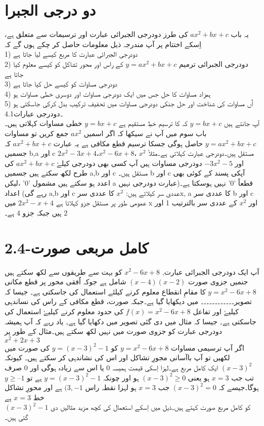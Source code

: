 \section{دو درجی الجبرا}
 یہ باب \(ax^{2}+bx+c\) کی طرز دودرجی الجبرائی عبارت اور ترسیمات سے متعلق ہے، اِسکے اختتام پر آپ مندرجہ ذیل معلومات حاصل کر چکے ہوں گے کہ\\
 1) دودرجی الجبرائی عبارت کا مربع کیسے لیا جاتا ہے\\
   2) دودرجی الجبرائی ترمیم \(y=ax^{2}+bx+c\) کے راس اور محور تشاکل کو کیسے معلوم کیا جاتا ہے\\
 3) دودرجی مساوات کو کیسے حل کیا جاتا ہے\\
 4) ہمزاد مساوات کا حل جس میں ایک دودرجی مساوات اور  دوسری خطی مساوات ہو\\
 5) اٌں مساوات کی شناخت اور حل جنکی دودرجی مساوات میں تحفیف ترکیب بدل کرکی جاسکتی ہو\\
 4.1۔دودرجی عبارات\\
 آپ جانتے ہیں \(y=bx+c\) کہ کا ترسیم خطِ مستقیم ہے \(y=bx+c\) خطی مساوات کہلاتی ہیں۔باب سوم میں آپ نے سیکھا کہ اگر اسمیں \(ax^{2}\) جمع کریں تو مساوات \(y=ax^{2}+bx+c\) حاصل ہوگی جسکا ترسیم قطع مکافی ہے یہ عبارت  \(ax^{2}+bx+c\) کہ جسمیں b,a اور c مستقل ہیں۔دودرجی عبارت کہلاتی ہے۔مثلاً \(x^{2}\) ،\(x^{2}-6x+8\)،\(2x^{2}-3x+4\)  اور  \(-3x^{2}-5\) دودرجی مساوات ہیں آپ کسی بھی دودرجی کیلۓ \(ax^{2}+bx+c\) کی طرح لکھ سکتے ہیں جسمیں a,b اور c مستقل ہیں۔ b اور c آپکی پسند کے کوئی بھی اعدد ہو سکتے ہیں مشمول '0' ،لیکں a قطعاً '0' نہیں ہوسکتا ہے۔(عبارت دودرجی نہیں رہے گی) اعداد a,b اور c عددی سر کیلاتے ہیں: \(x^{2}\) کا عددی سرx, a  کا عددی سر b اور c عمومی طور پر مستقل جزو کہلاتا ہے \(2x^{2}-x+4\) میں x اور \(x^{2}\) کے عددی سر بالترتیب 1 اور 2 ہیں جبکہ جزو 4 ہے۔\\
\section{ 2.4-کامل مربعی صورت}
 آپ ایک دودرجی الجبرائی عبارت, \(x^{2}-6x+8\) کو بہت سے طریقوں سے لکھ سکتے ہیں جنمیں جزوی صورت \((x-4)(x-2)\) شامل ہے جوکہ اٌفقی محور پر قطع مکانی \(y=x^{2}-6x+8\) کا مقامِ انقطاع معلوم کرنے کیلئے استعمال کی جاسکتی ہے۔ جیسا کہ تصویر۔۔۔۔۔۔۔۔۔۔۔۔ میں دیکھایا گیا ہے۔جبکہ صورت، قطع مکافی کے راس کی نساندہی کیلیۓ اور تفاعل \(f(x)=x^{2}-6x+8\) کی حدود معلوم کرنے کیلیۓ استعمال کی جاسکتی ہے۔ جیسا کہ مثال میں دی گئی تصویر میں دکھایا گیا ہے۔ یاد رہے کہ آپ ہمیشہ دودرجی عبارت کو جزوی صورت میں نہیں لکھ سکتے ہیں۔مثال کے طور پر \(x^{2}+2x+3\)\\
 \newpage
 اگر آپ ترسیمی مساوات \(y=x^{2}-6x+8\) کو \(y=(x-3)^{2}-1\) کی صورت میں لکھیں تو آپ باآسانی مجورِ تشاکل اور اس کی نشاندہی کر سکتے ہیں۔ کیونکہ \((x-3)^{2}\) ایک کامل مربع ہے۔لہزا اِسکی قیمت ہمیسہ 0 یا اس سے زیادہ ہوگی اور 0 صرف تب جب \(x=3\) ہو یعنی  \((x-3)^{2}\ge 0\)  ہو اور چونکہ \(y=(x-3)^{2}-1\) ہے تو  \(y\ge – 1\) ہوگا۔جیسے کہ \((x-3)^{2}=0\)  جب \(x=3\) ہو لہزا نقطہ راس  \((3,-1\) ہے اور محورِ تشاکل خط  \(x=3\) ہے\\ \((x-3)^{2}-1\) کو کامل مربع صورت کہتے ہیں۔ذیل میں اِسکے استعمال کی کچھ مزید مثالیں دی  گئی ہیں۔\\
